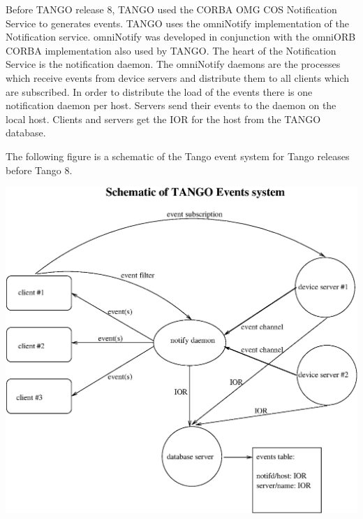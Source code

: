 Before TANGO release 8, TANGO used the CORBA OMG COS Notification
Service to generates events. TANGO uses
the omniNotify implementation of the Notification
service. omniNotify was developed in conjunction with the omniORB
CORBA implementation also used by TANGO. The heart of the Notification
Service is the notification daemon. The omniNotify daemons are the
processes which receive events from device servers and distribute
them to all clients which are subscribed. In order to distribute the
load of the events there is one notification daemon per host. Servers
send their events to the daemon on the local host. Clients and servers
get the IOR for the host from the TANGO database. 

The following figure is a schematic of the Tango event system for
Tango releases before Tango 8.

\vspace{0.3cm}

\begin{center}
\includegraphics[bb=0bp 0bp 523bp 485bp,clip,scale=0.8]{ds_model/event_schematic}
\par\end{center}

\vspace{0.3cm}

